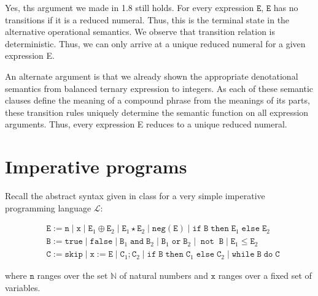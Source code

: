 \documentclass[a4paper,10pt]{article}
\newcommand{\E}{\mathtt{E}}
\newcommand{\B}{\mathtt{B}}
\newcommand{\C}{\mathtt{C}}
\newcommand{\true}{\mathtt{true}}
\newcommand{\false}{\mathtt{false}}
\newcommand{\andsym}{\mathtt{and}}
\newcommand{\orsym}{\mathtt{or}}
\newcommand{\notsym}{\mathop{\mathtt{not}}}
\newcommand{\ifsym}{\mathtt{if}}
\newcommand{\then}{\mathtt{then}}
\newcommand{\elsesym}{\mathtt{else}}
\newcommand{\whilesym}{\mathtt{while}}
\newcommand{\dosym}{\mathtt{do}}
\newcommand{\skipsym}{\mathtt{skip}}
\newcommand{\negation}{\mathtt{neg}}
\newcommand{\question}[1]
{\color{DarkBlue}#1 \color{Black} \newline}
\begin{document}
\begin{enumerate}
Yes, ths argument we made in 1.8 still holds. For every expression $\E$, $\E$
has no transitions if it is a reduced numeral.
Thus, this is the terminal state in the alternative operational semantics. 
We observe that transition relation is deterministic. Thus, we can only arrive
at a unique reduced numeral for a given expression E.

An alternate argument is that we already shown the appropriate denotational semantics 
from balanced ternary expression to integers. As each of these semantic clauses
define the meaning of a compound phrase from the meanings of its parts, 
these transition rules uniquely determine the semantic function on all
expression arguments. Thus, every expression E reduces to a unique reduced numeral.

\end{enumerate}



\section{Imperative programs}

\question{
Recall the abstract syntax given in class for a very simple imperative programming language $\mathcal{L}$:

\begin{align*}
& \E := \mathtt{n} \; | \; \mathtt{x} \; | \; \E_1 \oplus \E_2 \; | \; \E_1 \star \E_2 \; | \; \negation(\E) \; | \; \ifsym \; \B \; \then \; \E_1 \; \elsesym \; \E_2 \\ 
& \B := \true \; | \; \false \; | \; \B_1 \; \andsym \; \B_2 \; | \; \B_1 \; \orsym \; \B_2 \; | \; \notsym \; \B \; | \; \E_1 \leq \E_2 \\
& \C := \skipsym \; | \; \mathtt{x} := \E \; | \; \C_1 ; \C_2 \; | \; \ifsym \; \B \; \then \; \C_1 \; \elsesym \; \C_2 \; | \; \whilesym \; \B \; \dosym \; \C
\end{align*}

where $\mathtt{n}$ ranges over the set $\mathbb{N}$ of natural numbers and $\mathtt{x}$ 
ranges over a fixed set of variables.
}
\end{document}
